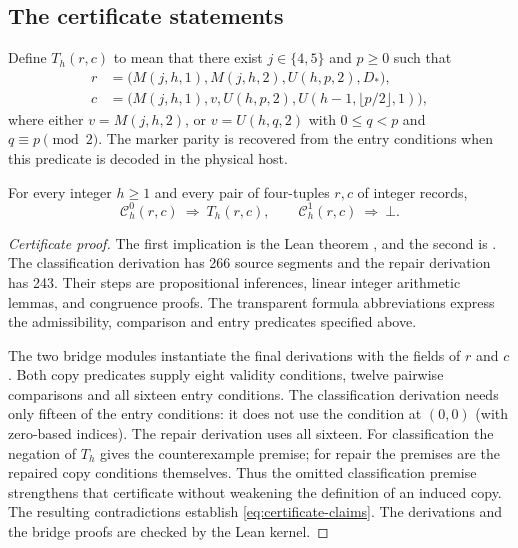 \subsection{The certificate statements}
Define $T_h(r,c)$ to mean that there exist $j\in\{4,5\}$ and $p\ge0$
such that
\begin{align*}
 r&=\bigl(M(j,h,1),M(j,h,2),U(h,p,2),D_*\bigr),\\
 c&=\bigl(M(j,h,1),v,U(h,p,2),U(h-1,\lfloor p/2\rfloor,1)\bigr),
\end{align*}
where either $v=M(j,h,2)$, or $v=U(h,q,2)$ with
$0\le q<p$ and $q\equiv p\pmod2$. The marker parity is recovered
from the entry conditions when this predicate is decoded in the physical
host.

\begin{lemma}\label{lem:arithmetic}
For every integer $h\ge1$ and every pair of four-tuples $r,c$ of integer
records,
\begin{equation}\label{eq:certificate-claims}
 \mathcal C_h^0(r,c)\ \Longrightarrow\ T_h(r,c),
 \qquad
 \mathcal C_h^1(r,c)\ \Longrightarrow\ \bot.
\end{equation}
\end{lemma}
\begin{proof}[Certificate proof]
The first implication is the Lean theorem
, and the second is
. The classification derivation has
266 source segments and the repair derivation has 243. Their steps are
propositional inferences, linear integer arithmetic lemmas, and
congruence proofs. The transparent formula abbreviations express the
admissibility, comparison and entry predicates specified above.

The two bridge modules instantiate the final derivations with the fields
of $r$ and $c$. Both copy predicates supply eight validity conditions,
twelve pairwise comparisons and all sixteen entry conditions. The
classification derivation needs only fifteen of the entry conditions:
it does not use the condition at $(0,0)$ (with zero-based indices).
The repair derivation uses all sixteen. For classification the negation
of $T_h$ gives the counterexample premise; for repair the premises are
the repaired copy conditions themselves. Thus the omitted classification
premise strengthens that certificate without weakening the definition
of an induced copy.
The resulting contradictions establish \eqref{eq:certificate-claims}.
The derivations and the bridge proofs are checked by the Lean kernel.
\end{proof}

